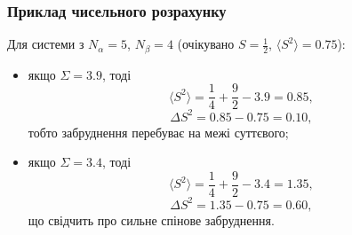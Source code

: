 \subsubsection*{Приклад чисельного розрахунку}

Для системи з $N_\alpha = 5$, $N_\beta = 4$ (очікувано $S=\frac{1}{2}$, $\langle S^2 \rangle = 0.75$):

\begin{itemize}
    \item якщо $\Sigma = 3.9$, тоді
    \[
    \langle S^2 \rangle = \frac{1}{4} + \frac{9}{2} - 3.9 = 0.85,
    \]
    \[
    \Delta S^2 = 0.85 - 0.75 = 0.10,
    \]
    тобто забруднення перебуває на межі суттєвого;

    \item якщо $\Sigma = 3.4$, тоді
    \[
    \langle S^2 \rangle = \frac{1}{4} + \frac{9}{2} - 3.4 = 1.35,
    \]
    \[
    \Delta S^2 = 1.35 - 0.75 = 0.60,
    \]
    що свідчить про сильне спінове забруднення.
\end{itemize}

%


